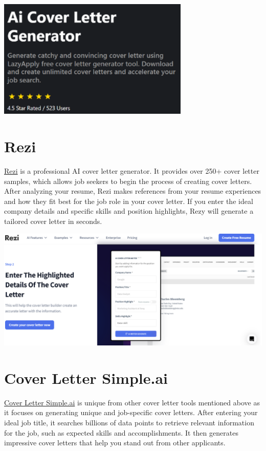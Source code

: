 \documentclass[
]{book}
\begin{document}
\includegraphics[width=3.59375in,height=\textheight]{Lazyapply pic.png}

\hypertarget{rezi}{%
\section{Rezi}\label{rezi}}

\href{https://www.rezi.ai/}{Rezi} is a professional AI cover letter generator. It provides over 250+ cover letter samples, which allows job seekers to begin the process of creating cover letters. After analyzing your resume, Rezi makes references from your resume experiences and how they fit best for the job role in your cover letter. If you enter the ideal company details and specific skills and position highlights, Rezy will generate a tailored cover letter in seconds.~

\includegraphics[width=5.5in,height=\textheight]{Rezi pic.png}

\hypertarget{cover-letter-simple.ai}{%
\section{Cover Letter Simple.ai}\label{cover-letter-simple.ai}}

\href{https://coverlettersimple.ai/}{Cover Letter Simple.ai} is unique from other cover letter tools mentioned above as it focuses on generating unique and job-specific cover letters. After entering your ideal job title, it searches billions of data points to retrieve relevant information for the job, such as expected skills and accomplishments. It then generates impressive cover letters that help you stand out from other applicants.
\end{document}

